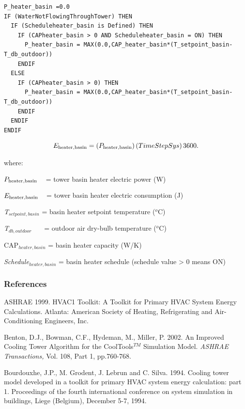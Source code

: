 \begin{lstlisting}
P_heater_basin =0.0
IF (WaterNotFlowingThroughTower) THEN
  IF (Scheduleheater_basin is Defined) THEN
    IF (CAPheater_basin > 0 AND Scheduleheater_basin = ON) THEN
      P_heater_basin = MAX(0.0,CAP_heater_basin*(T_setpoint_basin-T_db_outdoor))
    ENDIF
  ELSE
    IF (CAPheater_basin > 0) THEN
      P_heater_basin = MAX(0.0,CAP_heater_basin*(T_setpoint_basin-T_db_outdoor))
    ENDIF
  ENDIF
ENDIF
\end{lstlisting}

\begin{equation}
{E_{{\rm{heater,basin}}}} = \left( {{P_{{\rm{heater,basin}}}}} \right)\left( {TimeStepSys} \right){\rm{3600}}{\rm{.}}
\end{equation}

where:

\({P_{{\rm{heater,basin}}}}\) ~ = tower basin heater electric power (W)

\({E_{{\rm{heater,basin}}}}\) ~ = tower basin heater electric consumption (J)

\emph{T\(_{setpoint,basin}\)} = basin heater setpoint temperature (\(^{o}\)C)

\emph{T\(_{db,outdoor}\)}~~~ = outdoor air dry-bulb temperature (\(^{o}\)C)

CAP\emph{\(_{heater,basin}\)} = basin heater capacity (W/K)

\emph{Schedule\(_{heater,basin}\)} = basin heater schedule (schedule value \textgreater{} 0 means ON)

\subsubsection{References}\label{references-1-005}

ASHRAE 1999. HVAC1 Toolkit: A Toolkit for Primary HVAC System Energy Calculations. Atlanta: American Society of Heating, Refrigerating and Air-Conditioning Engineers, Inc.

Benton, D.J., Bowman, C.F., Hydeman, M., Miller, P. 2002. An Improved Cooling Tower Algorithm for the CoolTools\(^{TM}\) Simulation Model. \emph{ASHRAE Transactions,} Vol. 108, Part 1, pp.760-768.

Bourdouxhe, J.P., M. Grodent, J. Lebrun and C. Silva. 1994. Cooling tower model developed in a toolkit for primary HVAC system energy calculation: part 1. Proceedings of the fourth international conference on system simulation in buildings, Liege (Belgium), December 5-7, 1994.

